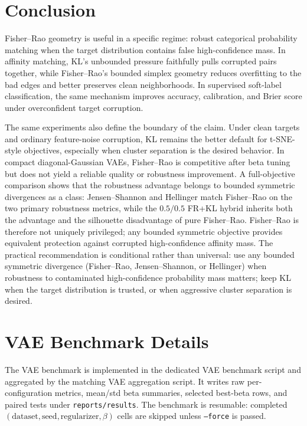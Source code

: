 \documentclass[11pt]{article}
\begin{document}
\section{Conclusion}

Fisher--Rao geometry is useful in a specific regime: robust categorical probability matching
when the target distribution contains false high-confidence mass. In affinity matching, KL's
unbounded pressure faithfully pulls corrupted pairs together, while Fisher--Rao's bounded
simplex geometry reduces overfitting to the bad edges and better preserves clean neighborhoods.
In supervised soft-label classification, the same mechanism improves accuracy, calibration, and
Brier score under overconfident target corruption.

The same experiments also define the boundary of the claim. Under clean targets and ordinary
feature-noise corruption, KL remains the better default for t-SNE-style objectives, especially
when cluster separation is the desired behavior. In compact diagonal-Gaussian VAEs,
Fisher--Rao is competitive after beta tuning but does not yield a reliable quality or
robustness improvement. A full-objective comparison shows that the robustness advantage belongs
to bounded symmetric divergences as a class: Jensen--Shannon and Hellinger match Fisher--Rao
on the two primary robustness metrics, while the $0.5/0.5$ FR+KL hybrid inherits both the
advantage and the silhouette disadvantage of pure Fisher--Rao. Fisher--Rao is therefore not
uniquely privileged; any bounded symmetric objective provides equivalent protection against
corrupted high-confidence affinity mass. The practical recommendation is conditional rather
than universal: use any bounded symmetric divergence (Fisher--Rao, Jensen--Shannon, or
Hellinger) when robustness to contaminated high-confidence probability mass matters; keep KL
when the target distribution is trusted, or when aggressive cluster separation is desired.

\appendix

\section{VAE Benchmark Details}
\label{app:vae}

The VAE benchmark is implemented in the dedicated VAE benchmark script and aggregated by the
matching VAE aggregation script. It writes raw per-configuration metrics, mean/std beta
summaries, selected best-beta rows, and paired tests under \texttt{reports/results}. The
benchmark is resumable: completed $(\text{dataset},\text{seed},\text{regularizer},\beta)$
cells are skipped unless \texttt{--force} is passed.
\end{document}

